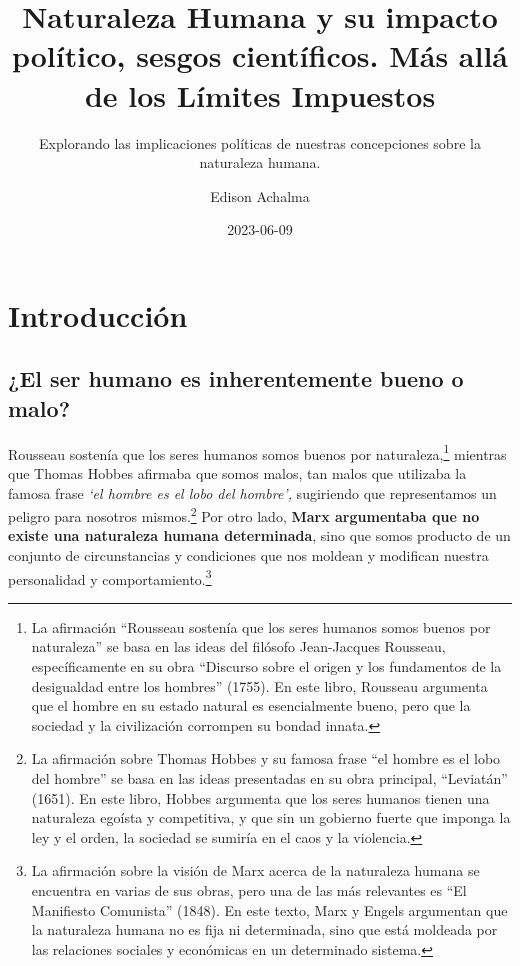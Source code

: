 \documentclass[
  letterpaper,
  DIV=11,
  numbers=noendperiod]{scrartcl}
\title{Naturaleza Humana y su impacto político, sesgos científicos. Más
allá de los Límites Impuestos}
\subtitle{Explorando las implicaciones políticas de nuestras
concepciones sobre la naturaleza humana.}
\author{Edison Achalma}
\date{2023-06-09}
\begin{document}
\maketitle
\ifdefined\Shaded\renewenvironment{Shaded}{\begin{tcolorbox}[interior hidden, boxrule=0pt, sharp corners, enhanced, breakable, frame hidden, borderline west={3pt}{0pt}{shadecolor}]}{\end{tcolorbox}}\fi

\hypertarget{introducciuxf3n}{%
\section{Introducción}\label{introducciuxf3n}}

\hypertarget{el-ser-humano-es-inherentemente-bueno-o-malo}{%
\subsection{¿El ser humano es inherentemente bueno o
malo?}\label{el-ser-humano-es-inherentemente-bueno-o-malo}}

Rousseau sostenía que los seres humanos somos buenos por
naturaleza,\footnote{La afirmación ``Rousseau sostenía que los seres
  humanos somos buenos por naturaleza'' se basa en las ideas del
  filósofo Jean-Jacques Rousseau, específicamente en su obra ``Discurso
  sobre el origen y los fundamentos de la desigualdad entre los
  hombres'' (1755). En este libro, Rousseau argumenta que el hombre en
  su estado natural es esencialmente bueno, pero que la sociedad y la
  civilización corrompen su bondad innata.} mientras que Thomas Hobbes
afirmaba que somos malos, tan malos que utilizaba la famosa frase
\emph{`el hombre es el lobo del hombre',} sugiriendo que representamos
un peligro para nosotros mismos.\footnote{La afirmación sobre Thomas
  Hobbes y su famosa frase ``el hombre es el lobo del hombre'' se basa
  en las ideas presentadas en su obra principal, ``Leviatán'' (1651). En
  este libro, Hobbes argumenta que los seres humanos tienen una
  naturaleza egoísta y competitiva, y que sin un gobierno fuerte que
  imponga la ley y el orden, la sociedad se sumiría en el caos y la
  violencia.} Por otro lado, \textbf{Marx argumentaba que no existe una
naturaleza humana determinada}, sino que somos producto de un conjunto
de circunstancias y condiciones que nos moldean y modifican nuestra
personalidad y comportamiento.\footnote{La afirmación sobre la visión de
  Marx acerca de la naturaleza humana se encuentra en varias de sus
  obras, pero una de las más relevantes es ``El Manifiesto Comunista''
  (1848). En este texto, Marx y Engels argumentan que la naturaleza
  humana no es fija ni determinada, sino que está moldeada por las
  relaciones sociales y económicas en un determinado sistema.}
\end{document}
